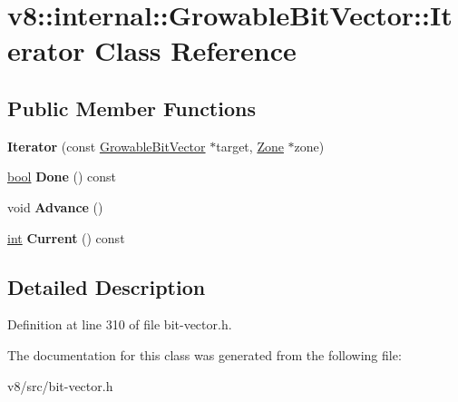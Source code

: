 \hypertarget{classv8_1_1internal_1_1GrowableBitVector_1_1Iterator}{}\section{v8\+:\+:internal\+:\+:Growable\+Bit\+Vector\+:\+:Iterator Class Reference}
\label{classv8_1_1internal_1_1GrowableBitVector_1_1Iterator}
\subsection*{Public Member Functions}
\begin{DoxyCompactItemize}
\item 
\mbox{\label{classv8_1_1internal_1_1GrowableBitVector_1_1Iterator_ab0889b533c4b56ac636a13f2ac6dea38}} 
{\bfseries Iterator} (const \mbox{\hyperlink{classv8_1_1internal_1_1GrowableBitVector}{Growable\+Bit\+Vector}} $\ast$target, \mbox{\hyperlink{classv8_1_1internal_1_1Zone}{Zone}} $\ast$zone)
\item 
\mbox{\label{classv8_1_1internal_1_1GrowableBitVector_1_1Iterator_a9ee35f6e68dc97a79bda840c469d4591}} 
\mbox{\hyperlink{classbool}{bool}} {\bfseries Done} () const
\item 
\mbox{\label{classv8_1_1internal_1_1GrowableBitVector_1_1Iterator_af18be410050048777b05f245861dabb5}} 
void {\bfseries Advance} ()
\item 
\mbox{\label{classv8_1_1internal_1_1GrowableBitVector_1_1Iterator_afbd1559bb9c5c5be9fc918b9004f9d0b}} 
\mbox{\hyperlink{classint}{int}} {\bfseries Current} () const
\end{DoxyCompactItemize}


\subsection{Detailed Description}


Definition at line 310 of file bit-\/vector.\+h.



The documentation for this class was generated from the following file\+:\begin{DoxyCompactItemize}
\item 
v8/src/bit-\/vector.\+h\end{DoxyCompactItemize}

